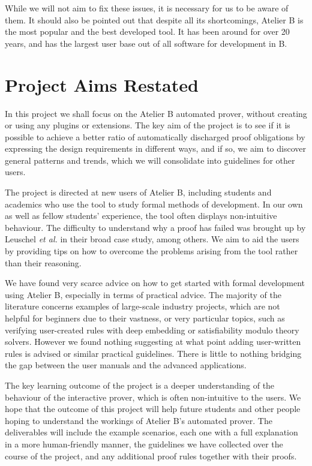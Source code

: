 \documentclass[11pt,journal]{IEEEtran}
\begin{document}
	While we will not aim to fix these issues, it is necessary for us to be aware of them. It should also be pointed out that despite all its shortcomings, Atelier B is the most popular and the best developed tool. It has been around for over 20 years, and has the largest user base out of all software for development in B. 
	
	\section{Project Aims Restated}
	In this project we shall focus on the Atelier B automated prover, without creating or using any plugins or extensions. The key aim of the project is to see if it is possible to achieve a better ratio of automatically discharged proof obligations by expressing the design requirements in different ways, and if so, we aim to discover general patterns and trends, which we will consolidate into guidelines for other users.
	
	The project is directed at new users of Atelier B, including students and academics who use the tool to study formal methods of development. In our own as well as fellow students' experience, the tool often displays non-intuitive behaviour. The difficulty to understand why a proof has failed was brought up by Leuschel \emph{et al.} in their broad case study\cite{San Juan metro}, among others. We aim to aid the users by providing tips on how to overcome the problems arising from the tool rather than their reasoning.
	
	We have found very scarce advice on how to get started with formal development using Atelier B, especially in terms of practical advice. The majority of the literature concerns examples of large-scale industry projects, which are not helpful for beginners due to their vastness, or very particular topics, such as verifying user-created rules with deep embedding\cite{embedding and theorem proving} or satisfiability modulo theory solvers\cite{SMT}. However we found nothing suggesting at what point adding user-written rules is advised or similar practical guidelines. There is little to nothing bridging the gap between the user manuals and the advanced applications.
	
	The key learning outcome of the project is a deeper understanding of the behaviour of the interactive prover, which is often non-intuitive to the users. We hope that the outcome of this project will help future students and other people hoping to understand the workings of Atelier B's automated prover. The deliverables will include the example scenarios, each one with a full explanation in a more human-friendly manner, the guidelines we have collected over the course of the project, and any additional proof rules together with their proofs.
	
\end{document}
